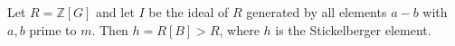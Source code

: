 Let $R = \mathbb{Z}[G]$ and let $I$ be the ideal of $R$ generated by all elements $a - b$ with $a,b$ prime to $m$. Then $h = R[B] > R$, where $h$ is the Stickelberger element.
